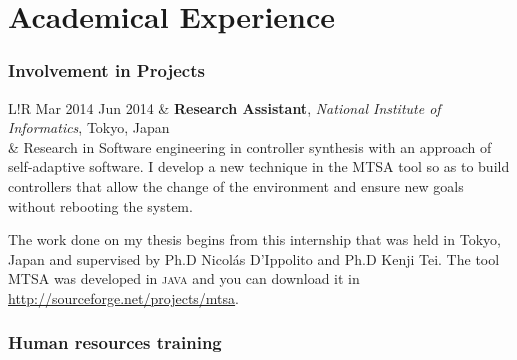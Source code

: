 \documentclass[10pt]{article}
\newcommand\VRule{\color{lightgray}\vrule width 0.5pt}
\begin{document}

\section*{Academical Experience}

\subsubsection*{Involvement in Projects}

\begin{tabular}{L!{\VRule}R}
Mar 2014 Jun 2014 & \textbf{Research Assistant}, \textit{National Institute of Informatics}, Tokyo, Japan\\
& \vspace{-0.7cm} Research in Software engineering in controller synthesis with an approach of self-adaptive software. I develop a new
technique in the MTSA tool so as to build controllers that allow the change of the environment and ensure new goals
without rebooting the system.

The work done on my thesis begins from this internship that was held in Tokyo, Japan and supervised by Ph.D Nicol\'as
D'Ippolito and Ph.D Kenji Tei. The tool MTSA was developed in \textsc{java} and you can download it in
\url{http://sourceforge.net/projects/mtsa}.\\
\end{tabular}

\subsubsection*{Human resources training}
\end{document}
